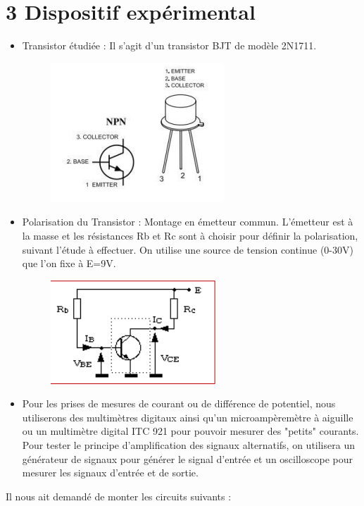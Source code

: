 \documentclass{report}
\begin{document}
\section*{3 Dispositif expérimental}

\begin{itemize}
\item Transistor étudiée : Il s'agit d'un transistor BJT de modèle 2N1711.
\begin{figure}[h!]
\centering
\includegraphics[scale=0.5]{Man1.png}
\end{figure}
\newpage
\item Polarisation du Transistor : Montage en émetteur commun. L'émetteur est à la masse et les résistances Rb et Rc sont à choisir pour définir la polarisation, suivant l'étude à effectuer. On utilise une source de tension continue (0-30V) que l'on fixe à E=9V.
\begin{figure}[h!]
\centering
\includegraphics[scale=0.5]{Man2.png}
\end{figure}
\item Pour les prises de mesures de courant ou de différence de potentiel, nous utiliserons des multimètres digitaux ainsi qu'un microampèremètre à aiguille ou un multimètre digital ITC 921 pour pouvoir mesurer des "petits" courants.\\
Pour tester le principe d'amplification des signaux alternatifs, on utilisera un générateur de signaux pour générer le signal d'entrée et un oscilloscope pour mesurer les signaux d'entrée et de sortie.\\
\end{itemize}
Il nous ait demandé de monter les circuits suivants : \\\\
\end{document}
